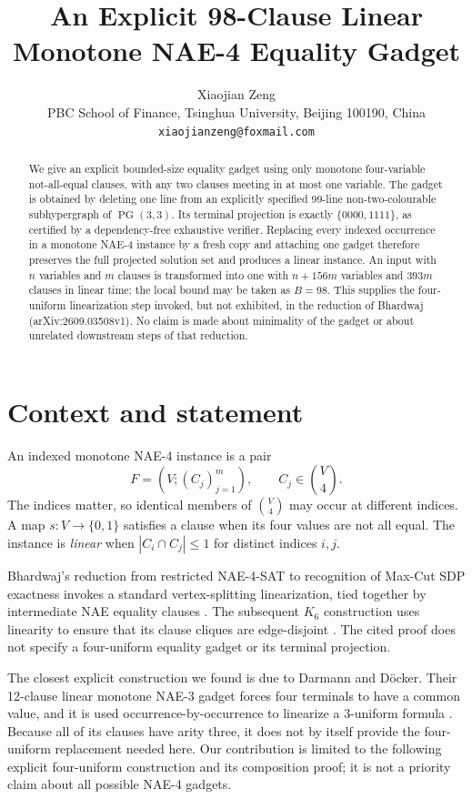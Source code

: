 \documentclass[11pt]{article}
\title{An Explicit 98-Clause Linear Monotone NAE-4 Equality Gadget}
\author{Xiaojian Zeng\\
  \small PBC School of Finance, Tsinghua University, Beijing 100190, China\\
  \small \texttt{xiaojianzeng@foxmail.com}}
\date{}
\theoremstyle{definition}
\begin{document}
\maketitle

\begin{abstract}
We give an explicit bounded-size equality gadget using only monotone
four-variable not-all-equal clauses, with any two clauses meeting in at most
one variable.  The gadget is obtained by deleting one line from an explicitly
specified 99-line non-two-colourable subhypergraph of
$\operatorname{PG}(3,3)$.  Its terminal projection is exactly
$\{0000,1111\}$, as certified by a dependency-free exhaustive verifier.
Replacing every indexed occurrence in a monotone NAE-4 instance by a fresh
copy and attaching one gadget therefore preserves the full projected solution
set and produces a linear instance.  An input with $n$ variables and $m$
clauses is transformed into one with $n+156m$ variables and $393m$ clauses in
linear time; the local bound may be taken as $B=98$.  This supplies the
four-uniform linearization step invoked, but not exhibited, in the reduction
of Bhardwaj (arXiv:2609.03508v1).  No claim is made about minimality of the
gadget or about unrelated downstream steps of that reduction.
\end{abstract}

\section{Context and statement}

An indexed monotone NAE-4 instance is a pair
\[
   F=(V;(C_j)_{j=1}^{m}), \qquad C_j\in \binom{V}{4}.
\]
The indices matter, so identical members of $\binom{V}{4}$ may occur at
different indices.  A map $s:V\to\{0,1\}$ satisfies a clause when its four
values are not all equal.  The instance is \emph{linear} when
$|C_i\cap C_j|\leq 1$ for distinct indices $i,j$.

Bhardwaj's reduction from restricted NAE-4-SAT to recognition of Max-Cut SDP
exactness invokes a standard vertex-splitting linearization, tied together by
intermediate NAE equality clauses \cite[Sec.~3.1, Lemma~1]{Bhardwaj2026}.
The subsequent $K_6$ construction uses linearity to ensure that its clause
cliques are edge-disjoint \cite[Sec.~3.2]{Bhardwaj2026}.  The cited proof does
not specify a four-uniform equality gadget or its terminal projection.

The closest explicit construction we found is due to Darmann and D\"ocker.
Their 12-clause linear monotone NAE-3 gadget forces four terminals to have a
common value, and it is used occurrence-by-occurrence to linearize a
3-uniform formula \cite[Lemma~3 and Theorem~2]{DarmannDocker2019}.  Because
all of its clauses have arity three, it does not by itself provide the
four-uniform replacement needed here.  Our contribution is limited to the
following explicit four-uniform construction and its composition proof; it
is not a priority claim about all possible NAE-4 gadgets.
\end{document}
